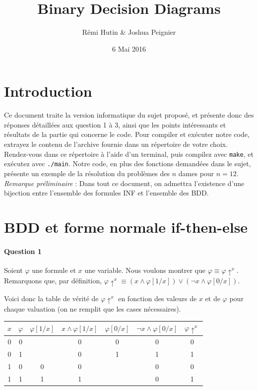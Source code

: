 \documentclass[a4paper,11pt]{article}
\title{Binary Decision Diagrams}
\author{Rémi Hutin \& Joshua Peignier}
\date{6 Mai 2016}
\begin{document}
\maketitle

	\section{Introduction}
	Ce document traite la version informatique du sujet proposé, et présente donc des réponses détaillées aux question 1 à 3, ainsi que les points intéressants et résultats de la partie qui concerne le code.\newline
	Pour compiler et exécuter notre code, extrayez le contenu de l'archive fournie dans un répertoire de votre choix. Rendez-vous dans ce répertoire à l'aide d'un terminal, puis compilez avec \texttt{make}, et exécutez avec \texttt{./main}. Notre code, en plus des fonctions demandées dans le sujet, présente un exemple de la résolution du problèmes des $n$ dames pour $n = 12$.\newline
	\emph{Remarque préliminaire} : Dans tout ce document, on admettra l'existence d'une bijection entre l'ensemble des formules INF et l'ensemble des BDD.
	 
	\section{BDD et forme normale if-then-else}

		\paragraph{Question 1}

		Soient $\varphi$ une formule et $x$ une variable.\newline
Nous voulons montrer que $\varphi \equiv\varphi\uparrow^{x}$.\newline
		Remarquons que, par définition, $\varphi\uparrow^{x} \equiv (x \wedge \varphi[1/x]) \vee (\neg x \wedge \varphi[0/x])$.
		
		Voici donc la table de vérité de $\varphi\uparrow^{x}$ en fonction des valeurs de $x$ et de $\varphi$ pour chaque valuation (on ne remplit que les cases nécessaires).\newline
		
		\begin{tabular}{|c|c|c|c|c|c|c|}
		\hline
		$x$ & $\varphi$ & $\varphi[1/x]$ &  $x \wedge \varphi[1/x]$ & $\varphi[0/x]$ & $\neg x \wedge \varphi[0/x]$ & $\varphi\uparrow^{x}$ \\
		\hline
		0 & 0 &   & 0 & 0 & 0 & 0 \\
		\hline
		0 & 1 &   & 0 & 1 & 1 & 1 \\
		\hline
		1 & 0 & 0 & 0 &   & 0 & 0 \\
		\hline
		1 & 1 & 1 & 1 &   & 0 & 1 \\
		\hline
		\end{tabular}
		
\end{document}
